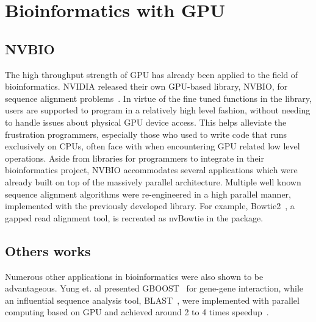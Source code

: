 \documentclass{PHlab-thesis}
\begin{document}
\section{Bioinformatics with GPU}
\subsection{NVBIO}
The high throughput strength of GPU has already been applied to the field of bioinformatics. NVIDIA released their own GPU-based library, NVBIO, for sequence alignment problems~\cite{nvbio2015}. In virtue of the fine tuned functions in the library, users are supported to program in a relatively high level fashion, without needing to handle issues about physical GPU device access. This helps alleviate the frustration programmers, especially those who used to write code that runs exclusively on CPUs, often face with when encountering GPU related low level operations. Aside from libraries for programmers to integrate in their bioinformatics project, NVBIO accommodates several applications which were already built on top of the massively parallel architecture. Multiple well known sequence alignment algorithms were re-engineered in a high parallel manner, implemented with the previously developed library. For example, Bowtie2~\cite{langmead2012fast}, a gapped read alignment tool, is recreated as nvBowtie in the package.
\subsection{Others works}
Numerous other applications in bioinformatics were also shown to be advantageous. Yung et. al presented GBOOST~\cite{yung2011gboost} for gene-gene interaction, while an influential sequence analysis tool, BLAST~\cite{altschul1990basic}, were implemented with parallel computing based on GPU and achieved around 2 to 4 times speedup~\cite{vouzis2011gpu}. 
\end{document}
